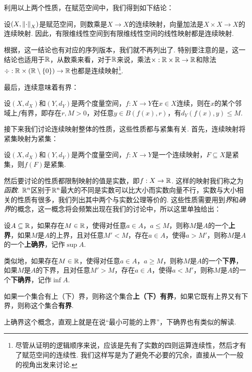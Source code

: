 利用以上两个性质，在赋范空间中，我们得到如下结论：
\begin{corollary}\label{cor:continuous-linear}
    设$(X,\left\|\cdot\right\|_X)$是赋范空间，则数乘是$X\to X$的连续映射，向量加法是$X\times X\to X$的连续映射. 因此，有限维线性空间到有限维线性空间的线性映射都是连续映射. 
\end{corollary}
根据，这一结论也有对应的序列版本，我们就不再列出了. 特别要注意的是，这一结论也适用于$\mathbb{R}$，从数乘来看，对于$\mathbb{R}$来说，乘法$\times:\mathbb{R}\times\mathbb{R}\to\mathbb{R}$和除法$\div:\mathbb{R}\times(\mathbb{R}\setminus\{0\})\to\mathbb{R}$也都是连续映射\footnote{尽管从证明的逻辑顺序来说，应该是先有了实数的四则运算连续性，然后才有了赋范空间的连续性. 我们这样写是为了避免不必要的冗余，直接从一个一般的视角出发来讨论. }. 

最后，连续意味着有界：
\begin{proposition}\label{prop:continuous-bounded}
    设$(X,d_X)$和$(Y,d_Y)$是两个度量空间，$f:X\to Y$在$x\in X$连续，则在$x$的某个邻域上$f$有界，即存在$r,M>0$，对任意$y\in B(f(x),r)$，有$d_Y(f(x),y)\leq M$. 
\end{proposition}

接下来我们讨论连续映射整体的性质，这些性质都与紧集有关. 首先，连续映射将紧集映射为紧集：

\begin{proposition}\label{prop:continuous-compact}
    设$(X,d_X)$和$(Y,d_Y)$是两个度量空间，$f:X\to Y$是一个连续映射，$F\subseteq X$是紧集，则$f(F)$是紧集. 
\end{proposition}

然后要讨论的性质都限制映射的值是实数，即$f:X\to \mathbb{R}$. 这样的映射我们称之为\emph{函数}. $\mathbb{R}^n$区别于$\mathbb{R}^n$最大的不同是实数可以比大小而实数向量不行，实数与大小相关的性质有很多，我们列出其中两个与实数公理等价的. 这些性质需要用到\emph{界}和\emph{确界}的概念，这一概念将会频繁出现在我们的讨论中，所以这里单独给出：

\begin{definition}
    设$A\subseteq\mathbb{R}$，如果存在$M\in\mathbb{R}$，使得对任意$a\in A$，$a\leq M$，则称$M$是$A$的一个\textbf{上界}，如果$M$是$A$的上界，且对任意$M'<M$，存在$a\in A$，使得$a>M'$，则称$M$是$A$的一个\textbf{上确界}，记作$\sup A$. 
    
    类似地，如果存在$M\in\mathbb{R}$，使得对任意$a\in A$，$a\geq M$，则称$M$是$A$的一个\textbf{下界}，如果$M$是$A$的下界，且对任意$M'>M$，存在$a\in A$，使得$a<M'$，则称$M$是$A$的一个\textbf{下确界}，记作$\inf A$. 
    
    如果一个集合有上（下）界，则称这个集合\textbf{上（下）有界}，如果它既有上界又有下界，则称这个集合\textbf{有界}. 
\end{definition}
上确界这个概念，直观上就是在说“最小可能的上界”，下确界也有类似的解读. 

